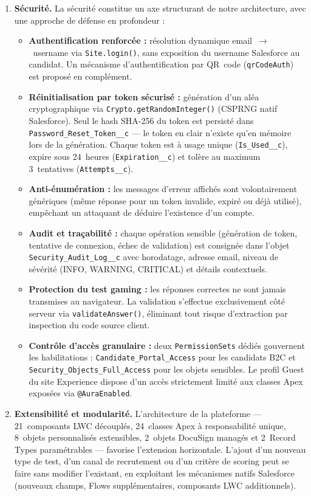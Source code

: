 \begin{enumerate}[label=\textbf{ENF-\arabic*}]
    \item \textbf{Sécurité.} La sécurité constitue un axe structurant de notre architecture, avec une approche de défense en profondeur :
    \begin{itemize}
        \item \textbf{Authentification renforcée :} résolution dynamique email~$\rightarrow$~username via \texttt{Site.login()}, sans exposition du username Salesforce au candidat. Un mécanisme d'authentification par QR~code (\texttt{qrCodeAuth}) est proposé en complément.
        \item \textbf{Réinitialisation par token sécurisé :} génération d'un aléa cryptographique via \texttt{Crypto.getRandomInteger()} (CSPRNG natif Salesforce). Seul le hash SHA-256 du token est persisté dans \texttt{Password\_Reset\_Token\_\_c} --- le token en clair n'existe qu'en mémoire lors de la génération. Chaque token est à usage unique (\texttt{Is\_Used\_\_c}), expire sous 24~heures (\texttt{Expiration\_\_c}) et tolère au maximum 3~tentatives (\texttt{Attempts\_\_c}).
        \item \textbf{Anti-énumération :} les messages d'erreur affichés sont volontairement génériques (même réponse pour un token invalide, expiré ou déjà utilisé), empêchant un attaquant de déduire l'existence d'un compte.
        \item \textbf{Audit et traçabilité :} chaque opération sensible (génération de token, tentative de connexion, échec de validation) est consignée dans l'objet \texttt{Security\_Audit\_Log\_\_c} avec horodatage, adresse email, niveau de sévérité (INFO, WARNING, CRITICAL) et détails contextuels.
        \item \textbf{Protection du test gaming :} les réponses correctes ne sont jamais transmises au navigateur. La validation s'effectue exclusivement côté serveur via \texttt{validateAnswer()}, éliminant tout risque d'extraction par inspection du code source client.
        \item \textbf{Contrôle d'accès granulaire :} deux \texttt{PermissionSets} dédiés gouvernent les habilitations : \texttt{Candidate\_Portal\_Access} pour les candidats B2C et \texttt{Security\_Objects\_Full\_Access} pour les objets sensibles. Le profil Guest du site Experience dispose d'un accès strictement limité aux classes Apex exposées via \texttt{@AuraEnabled}.
    \end{itemize}

    \item \textbf{Extensibilité et modularité.} L'architecture de la plateforme --- 21~composants LWC découplés, 24~classes Apex à responsabilité unique, 8~objets personnalisés extensibles, 2~objets DocuSign managés et 2~Record Types paramétrables --- favorise l'extension horizontale. L'ajout d'un nouveau type de test, d'un canal de recrutement ou d'un critère de scoring peut se faire sans modifier l'existant, en exploitant les mécanismes natifs Salesforce (nouveaux champs, Flows supplémentaires, composants LWC additionnels).


\end{enumerate}
